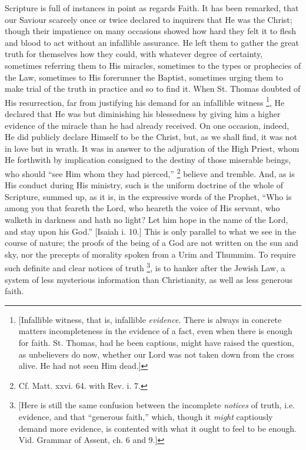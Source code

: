 Scripture is full of instances in point as regards Faith. It has
been remarked, that our Saviour scarcely once or twice declared to
inquirers that He was the Christ; though their impatience on many
occasions showed how hard they felt it to flesh and blood to act
without an infallible assurance. He left them to gather the great
truth for themselves how they could, with whatever degree of
certainty, sometimes referring them to His miracles, sometimes to the
types or prophecies of the Law, sometimes to His forerunner the
Baptist, sometimes urging them to make trial of the truth in practice
and so to find it. When St. Thomas doubted of His resurrection, far
from justifying his demand for an infallible witness \footnote{[Infallible witness, that is, infallible \emph{evidence}.
There is always in concrete matters incompleteness in the evidence of
a fact, even when there is enough for faith. St. Thomas, had he been
captious, might have raised the question, as unbelievers do now,
whether our Lord was not taken down from the cross alive. He had not
seen Him dead.]}, He declared that He was but diminishing his blessedness by
giving him a higher evidence of the miracle than he had already
received. On one occasion, indeed, He did publicly declare Himself to
be the Christ, but, as we shall find, it was not in love but in wrath.
It was in answer to the adjuration of the High Priest, whom He
forthwith by implication consigned to the destiny of those miserable
beings, who should ``see Him whom they had pierced,'' \footnote{Cf. Matt. xxvi. 64. with Rev. i. 7.} believe and tremble. And, as is His conduct during His
ministry, such is the uniform doctrine of the whole of Scripture,
summed up, as it is, in the expressive words of the Prophet, ``Who
is among you that feareth the Lord, who heareth the voice of His
servant, who walketh in darkness and hath no light? Let him hope in
the name of the Lord, and stay upon his God.'' [Isaiah i. 10.]
This is only parallel to what we see in the course of nature; the
proofs of the being of a God are not written on the sun and sky, nor
the precepts of morality spoken from a Urim and Thummim. To require
such definite and clear notices of truth \footnote{[Here is still the same confusion between
the incomplete \emph{notices} of truth, i.e. evidence, and that
``generous faith,'' which, though it \emph{might} captiously
demand more evidence, is contented with what it ought to feel to be
enough. Vid. Grammar of Assent, ch. 6 and 9.]}, is to hanker after the Jewish Law, a system of less
mysterious information than Christianity, as well as less generous
faith.

